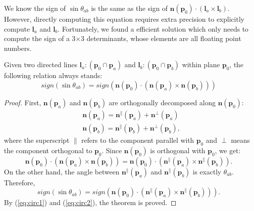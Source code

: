 We know the sign of $\sin{\theta_{ab}}$ is the same as the sign of $\bm{n}(\bm{p}_0) \cdot (\bm{l}_a\times\bm{l}_b)$. However, directly computing this equation requires extra precision to explicitly compute $\bm{l}_a$ and $\bm{l}_b$. Fortunately, we found a efficient solution which only needs to compute the sign of a 3$\times$3 determinants, whose elements are all floating point numbers.

\begin{theorem}
  \label{theorem1}
  Given two directed lines $\bm{l}_a\colon(\bm{p}_0\cap\bm{p}_a)$ and $\bm{l}_b\colon(\bm{p}_0\cap\bm{p}_b)$ within plane $\bm{p}_0$, the following relation always stands:
  \begin{equation}
    sign(\sin{\theta_{ab}})=  sign(\bm{n}(\bm{p}_0)\cdot(\bm{n}(\bm{p}_a) \times \bm{n}(\bm{p}_b)))
  \end{equation}
\end{theorem}

\begin{proof}
 First, $\bm{n}(\bm{p}_a)$ and $\bm{n}(\bm{p}_b)$ are orthogonally decomposed along $\bm{n}(\bm{p}_0)$:
 \begin{equation}
 \begin{split}
   &\bm{n}(\bm{p}_a)= \bm{n}^\parallel(\bm{p}_a) + \bm{n}^\perp(\bm{p}_a)\\
   &\bm{n}(\bm{p}_b)= \bm{n}^\parallel(\bm{p}_b) + \bm{n}^\perp(\bm{p}_b),
 \end{split}
 \end{equation}
 where the superscript $\parallel$ refers to the component parallel with $\bm{p}_0$ and $\perp$ means the component orthogonal to $\bm{p}_0$. Since $\bm{n}(\bm{p}_0)$ is orthogonal with $\bm{p}_0$, we get:
 \begin{equation}
   \label{eq:circ1}
   \bm{n}(\bm{p}_0) \cdot (\bm{n}(\bm{p}_a) \times \bm{n}(\bm{p}_b)) = \bm{n}(\bm{p}_0) \cdot (\bm{n}^\parallel(\bm{p}_a) \times \bm{n}^\parallel(\bm{p}_b)).
 \end{equation}
 On the other hand, the angle between $\bm{n}^\parallel(\bm{p}_a)$ and $\bm{n}^\parallel(\bm{p}_b)$ is exactly $\theta_{ab}$. Therefore,
 \begin{equation}
   \label{eq:circ2}
   sign(\sin{\theta_{ab}})=  sign(\bm{n}(\bm{p}_0) \cdot (\bm{n}^\parallel(\bm{p}_a) \times \bm{n}^\parallel(\bm{p}_b))).
 \end{equation}
 By (\ref{eq:circ1}) and (\ref{eq:circ2}), the theorem is proved.
\end{proof}

